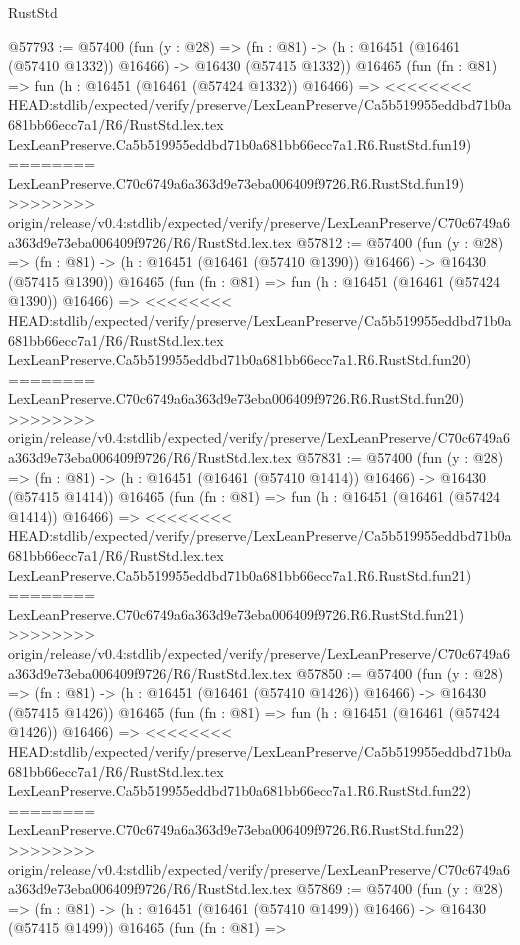 \begin{lexlean}{RustStd}
\begin{coremodule}
{\begin{coremodule}
{{{{{{{{{{{{{{{{{{{{{{{{{{{{{{{{{{{{{{{{{{{{{{{{{{{{{{{@57793 := @57400
    (fun (y : @28) =>
    (fn : @81) -> (h : @16451 (@16461 (@57410 @1332)) @16466) -> @16430 (@57415 @1332))
    @16465
    (fun (fn : @81) =>
    fun (h : @16451 (@16461 (@57424 @1332)) @16466) =>
<<<<<<<< HEAD:stdlib/expected/verify/preserve/LexLeanPreserve/Ca5b519955eddbd71b0a681bb66ecc7a1/R6/RustStd.lex.tex
    LexLeanPreserve.Ca5b519955eddbd71b0a681bb66ecc7a1.R6.RustStd.fun19)
========
    LexLeanPreserve.C70c6749a6a363d9e73eba006409f9726.R6.RustStd.fun19)
>>>>>>>> origin/release/v0.4:stdlib/expected/verify/preserve/LexLeanPreserve/C70c6749a6a363d9e73eba006409f9726/R6/RustStd.lex.tex
@57812 := @57400
    (fun (y : @28) =>
    (fn : @81) -> (h : @16451 (@16461 (@57410 @1390)) @16466) -> @16430 (@57415 @1390))
    @16465
    (fun (fn : @81) =>
    fun (h : @16451 (@16461 (@57424 @1390)) @16466) =>
<<<<<<<< HEAD:stdlib/expected/verify/preserve/LexLeanPreserve/Ca5b519955eddbd71b0a681bb66ecc7a1/R6/RustStd.lex.tex
    LexLeanPreserve.Ca5b519955eddbd71b0a681bb66ecc7a1.R6.RustStd.fun20)
========
    LexLeanPreserve.C70c6749a6a363d9e73eba006409f9726.R6.RustStd.fun20)
>>>>>>>> origin/release/v0.4:stdlib/expected/verify/preserve/LexLeanPreserve/C70c6749a6a363d9e73eba006409f9726/R6/RustStd.lex.tex
@57831 := @57400
    (fun (y : @28) =>
    (fn : @81) -> (h : @16451 (@16461 (@57410 @1414)) @16466) -> @16430 (@57415 @1414))
    @16465
    (fun (fn : @81) =>
    fun (h : @16451 (@16461 (@57424 @1414)) @16466) =>
<<<<<<<< HEAD:stdlib/expected/verify/preserve/LexLeanPreserve/Ca5b519955eddbd71b0a681bb66ecc7a1/R6/RustStd.lex.tex
    LexLeanPreserve.Ca5b519955eddbd71b0a681bb66ecc7a1.R6.RustStd.fun21)
========
    LexLeanPreserve.C70c6749a6a363d9e73eba006409f9726.R6.RustStd.fun21)
>>>>>>>> origin/release/v0.4:stdlib/expected/verify/preserve/LexLeanPreserve/C70c6749a6a363d9e73eba006409f9726/R6/RustStd.lex.tex
@57850 := @57400
    (fun (y : @28) =>
    (fn : @81) -> (h : @16451 (@16461 (@57410 @1426)) @16466) -> @16430 (@57415 @1426))
    @16465
    (fun (fn : @81) =>
    fun (h : @16451 (@16461 (@57424 @1426)) @16466) =>
<<<<<<<< HEAD:stdlib/expected/verify/preserve/LexLeanPreserve/Ca5b519955eddbd71b0a681bb66ecc7a1/R6/RustStd.lex.tex
    LexLeanPreserve.Ca5b519955eddbd71b0a681bb66ecc7a1.R6.RustStd.fun22)
========
    LexLeanPreserve.C70c6749a6a363d9e73eba006409f9726.R6.RustStd.fun22)
>>>>>>>> origin/release/v0.4:stdlib/expected/verify/preserve/LexLeanPreserve/C70c6749a6a363d9e73eba006409f9726/R6/RustStd.lex.tex
@57869 := @57400
    (fun (y : @28) =>
    (fn : @81) -> (h : @16451 (@16461 (@57410 @1499)) @16466) -> @16430 (@57415 @1499))
    @16465
    (fun (fn : @81) =>
}}}}}}}}}}}}}}}}}}}}}}}}}}}}}}}}}}}}}}}}}}}}}}}}}}}}}}}
\end{coremodule}}
\end{coremodule}
\end{lexlean}
